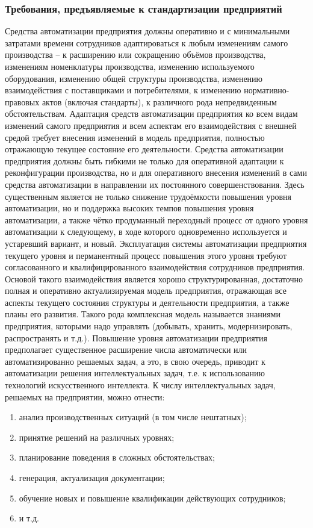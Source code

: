 \subsubsection{Требования, предъявляемые к стандартизации предприятий}
\label{sec_chapter_enterprise_standard_requirments}


Средства автоматизации предприятия должны оперативно и с минимальными затратами времени сотрудников адаптироваться к любым изменениям самого производства – к расширению или сокращению объёмов производства, изменениям номенклатуры производства, изменению используемого оборудования, изменению общей структуры производства, изменению взаимодействия с поставщиками и потребителями, к изменению нормативно-правовых актов (включая стандарты), к различного рода непредвиденным обстоятельствам.
Адаптация средств автоматизации предприятия ко всем видам изменений самого предприятия и всем аспектам его взаимодействия с внешней средой требует внесения изменений в модель предприятия, полностью отражающую текущее состояние его деятельности.
Средства автоматизации предприятия должны быть гибкими не только для оперативной адаптации к реконфигурации производства, но и для оперативного внесения изменений в сами средства автоматизации в направлении их постоянного совершенствования. Здесь существенным является не только снижение трудоёмкости повышения уровня автоматизации, но и поддержка высоких темпов повышения уровня автоматизации, а также чётко продуманный переходный процесс от одного уровня автоматизации к следующему, в ходе которого одновременно используется и устаревший вариант, и новый.
Эксплуатация системы автоматизации предприятия текущего уровня и перманентный процесс повышения этого уровня требуют согласованного и квалифицированного взаимодействия сотрудников предприятия. Основой такого взаимодействия является хорошо структурированная, достаточно полная и оперативно актуализируемая модель предприятия, отражающая все аспекты текущего состояния структуры и деятельности предприятия, а также планы его развития. Такого рода комплексная модель называется знаниями предприятия, которыми надо управлять (добывать, хранить, модернизировать, распространять и т.д.).
Повышение уровня автоматизации предприятия предполагает существенное расширение числа автоматически или автоматизированно решаемых задач, а это, в свою очередь, приводит к автоматизации решения интеллектуальных задач, т.е. к использованию технологий искусственного интеллекта. К числу интеллектуальных задач, решаемых на предприятии, можно отнести:
\begin{enumerate}
    \item анализ производственных ситуаций (в том числе нештатных);
    \item принятие решений на различных уровнях;
    \item планирование поведения в сложных обстоятельствах;
    \item генерация, актуализация документации;
    \item обучение новых и повышение квалификации действующих сотрудников;
    \item и т.д.
\end{enumerate}
